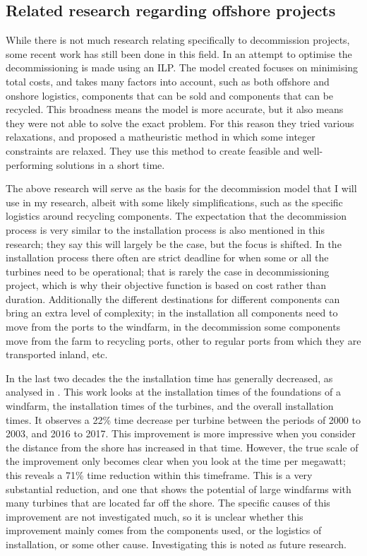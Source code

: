 \documentclass[a4paper,12pt]{article}
\begin{document}
\subsection{Related research regarding offshore projects} \label{ss:offsh}
While there is not much research relating specifically to decommission projects, some recent work has still been done in this field. In \cite{irawan2019optimisation} an attempt to optimise the decommissioning is made using an ILP. The model created focuses on minimising total costs, and takes many factors into account, such as both offshore and onshore logistics, components that can be sold and components that can be recycled. This broadness means the model is more accurate, but it also means they were not able to solve the exact problem. For this reason they tried various relaxations, and proposed a matheuristic method in which some integer constraints are relaxed. They use this method to create feasible and well-performing solutions in a short time.

The above research will serve as the basis for the decommission model that I will use in my research, albeit with some likely simplifications, such as the specific logistics around recycling components. The expectation that the decommission process is very similar to the installation process is also mentioned in this research; they say this will largely be the case, but the focus is shifted. In the installation process there often are strict deadline for when some or all the turbines need to be operational; that is rarely the case in decommissioning project, which is why their objective function is based on cost rather than duration. Additionally the different destinations for different components can bring an extra level of complexity; in the installation all components need to move from the ports to the windfarm, in the decommission some components move from the farm to recycling ports, other to regular ports from which they are transported inland, etc. 

\bigskip

In the last two decades the the installation time has generally decreased, as analysed in \cite{lacal2018offshore}. This work looks at the installation times of the foundations of a windfarm, the installation times of the turbines, and the overall installation times. It observes a 22\% time decrease per turbine between the periods of 2000 to 2003, and 2016 to 2017. This improvement is more impressive when you consider the distance from the shore has increased in that time. However, the true scale of the improvement only becomes clear when you look at the time per megawatt; this reveals a 71\% time reduction within this timeframe. This is a very substantial reduction, and one that shows the potential of large windfarms with many turbines that are located far off the shore. The specific causes of this improvement are not investigated much, so it is unclear whether this improvement mainly comes from the components used, or the logistics of installation, or some other cause. Investigating this is noted as future research. 
\end{document}

